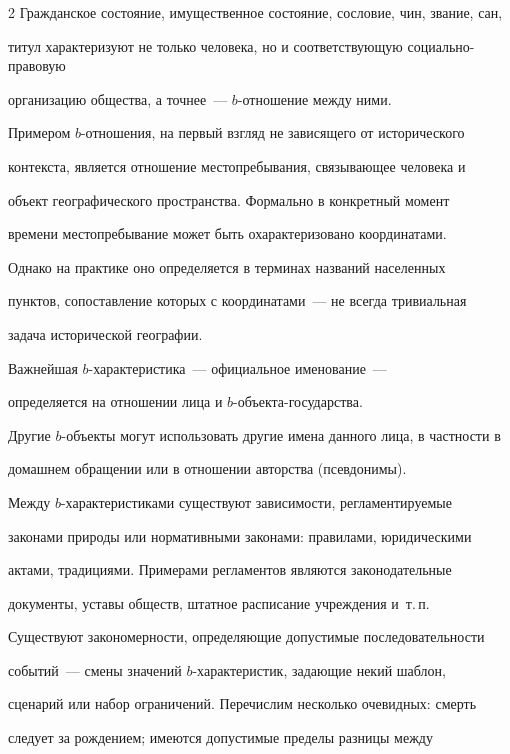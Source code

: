 \begin{multicols}{2}
Гражданское состояние, имущественное состояние, сословие, чин, звание, сан, 


титул характеризуют не только человека, но и соответствующую социально-правовую 


организацию общества, а точнее~--- $b$-от\-но\-ше\-ние между ними.


  


  Примером $b$-отношения, на первый взгляд не зависящего от исторического 


контекста, является отношение местопребывания, связывающее человека и 


объект географического пространства. Формально в конкретный момент 


времени местопребывание может быть охарактеризовано координатами. 


Однако на практике оно определяется в терминах названий населенных 


пунктов, сопоставление которых с координатами~--- не всегда тривиальная 


задача исторической географии.


  


  Важнейшая $b$-характеристика~--- официальное именование~--- 


определяется на отношении лица и $b$-объекта-государства. 


Другие $b$-объекты могут использовать другие имена данного лица, в част\-ности в 


домашнем обращении или в отношении авторства (псевдонимы).


  


  Между $b$-характеристиками существуют зависимости, регламентируемые 


законами природы или нормативными законами: правилами, юридическими 


актами, традициями. Примерами регламентов являются законодательные 


документы, уставы обществ, штатное расписание учреждения и~т.\,п. 


Существуют закономерности, определяющие до\-пус\-ти\-мые последовательности 


событий~--- смены значений $b$-характеристик, задающие некий шаб\-лон, 


сценарий или набор ограничений. Перечислим несколько очевидных: смерть 


следует за рож\-де\-ни\-ем; имеются допустимые пределы разницы между 



\end{multicols}
